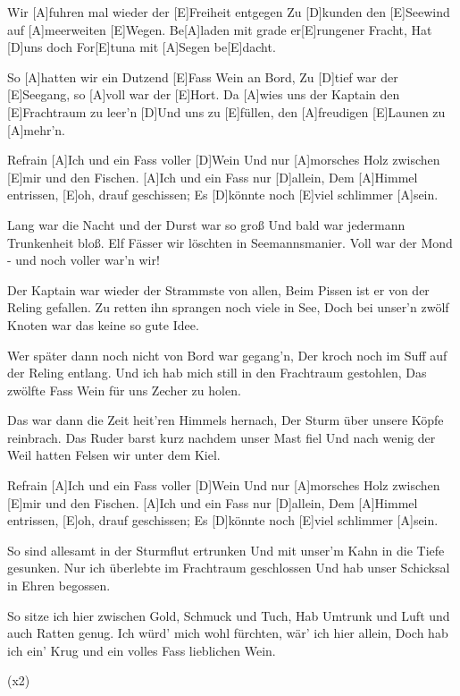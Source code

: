 

\begin{guitar}
	Wir [A]fuhren mal wieder der [E]Freiheit entgegen
	Zu [D]kunden den [E]Seewind auf [A]meerweiten [E]Wegen.
	Be[A]laden mit grade er[E]rungener Fracht,
	Hat [D]uns doch For[E]tuna mit [A]Segen be[E]dacht.
	
	So [A]hatten wir ein Dutzend [E]Fass Wein an Bord,
	Zu [D]tief war der [E]Seegang, so [A]voll war der [E]Hort.
	Da [A]wies uns der Kaptain den [E]Frachtraum zu leer'n
	[D]Und uns zu [E]füllen, den [A]freudigen [E]Launen zu [A]mehr'n.
	
  \begin{chorus}{Refrain}
	[A]Ich und ein Fass voller [D]Wein
	Und nur [A]morsches Holz zwischen [E]mir und den Fischen.
	[A]Ich und ein Fass nur [D]allein,
	Dem [A]Himmel entrissen, [E]oh, drauf geschissen;
	Es [D]könnte noch [E]viel schlimmer [A]sein.%
  \end{chorus}
	
	Lang war die Nacht und der Durst war so groß
	Und bald war jedermann Trunkenheit bloß.
	Elf Fässer wir löschten in Seemannsmanier.
	Voll war der Mond - und noch voller war'n wir!
	
	Der Kaptain war wieder der Strammste von allen,
	Beim Pissen ist er von der Reling gefallen.
	Zu retten ihn sprangen noch viele in See,
	Doch bei unser'n zwölf Knoten war das keine so gute Idee.
	
	 
	
	\pagebreak
	
	Wer später dann noch nicht von Bord war gegang'n,
	Der kroch noch im Suff auf der Reling entlang.
	Und ich hab mich still in den Frachtraum gestohlen,
	Das zwölfte Fass Wein für uns Zecher zu holen.
	
	Das war dann die Zeit heit'ren Himmels hernach,
	Der Sturm über unsere Köpfe reinbrach.
	Das Ruder barst kurz nachdem unser Mast fiel
	Und nach wenig der Weil hatten Felsen wir unter dem Kiel.
	
  \begin{chorus}{Refrain}
	[A]Ich und ein Fass voller [D]Wein
	Und nur [A]morsches Holz zwischen [E]mir und den Fischen.
	[A]Ich und ein Fass nur [D]allein,
	Dem [A]Himmel entrissen, [E]oh, drauf geschissen;
	Es [D]könnte noch [E]viel schlimmer [A]sein.%
  \end{chorus}
	
	So sind allesamt in der Sturmflut ertrunken
	Und mit unser'm Kahn in die Tiefe gesunken.
	Nur ich überlebte im Frachtraum geschlossen
	Und hab unser Schicksal in Ehren begossen.
	
	So sitze ich hier zwischen Gold, Schmuck und Tuch,
	Hab Umtrunk und Luft und auch Ratten genug.
	Ich würd' mich wohl fürchten, wär' ich hier allein,
	Doch hab ich ein' Krug und ein volles Fass lieblichen Wein.
	
	  (x2)
\end{guitar}

